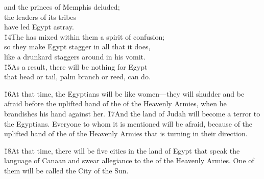 \begin{poetry}
\poemll    and the princes of Memphis deluded; \\
\poeml the leaders of its tribes \\
\poemll    have led Egypt astray. \\
\poeml \v{14}The  has mixed within them a spirit of confusion; \\
\poemll    so they make Egypt stagger in all that it does, \\
\poemlll       like a drunkard staggers around in his vomit. \\
\poeml \v{15}As a result, there will be nothing for Egypt \\
\poemll    that head or tail, palm branch or reed, can do.
\end{poetry}

\v{16}At that time, the Egyptians will be like women---they will shudder and be afraid before the uplifted hand of the  of the Heavenly Armies, when he brandishes his hand against her. \v{17}And the land of Judah will become a terror to the Egyptians. Everyone to whom it is mentioned will be afraid, because of the uplifted hand of the  of the Heavenly Armies that is turning in their direction.

\v{18}At that time, there will be five cities in the land of Egypt that speak the language of Canaan and swear allegiance to the  of the Heavenly Armies. One of them will be called the City of the Sun.

